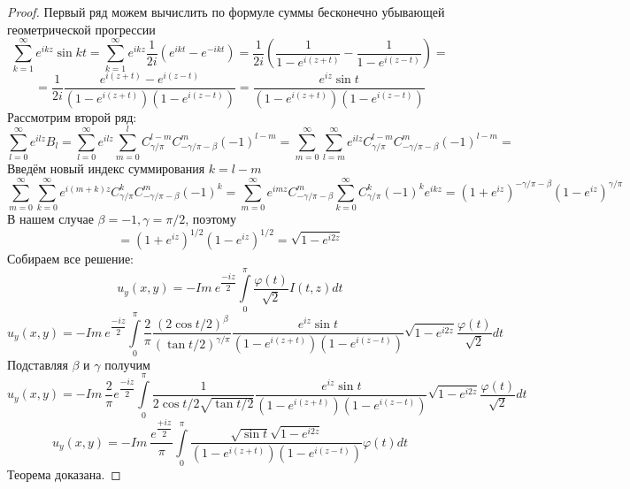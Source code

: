 \documentclass[a4paper, 9pt]{article}
\begin{document}
\begin{proof}
		Первый ряд можем вычислить по формуле суммы бесконечно убывающей геометрической прогрессии
		\begin{equation*}
			\sum\limits_{k=1}^{\infty} e^{ikz}\sin{kt} =  \sum\limits_{k=1}^{\infty} e^{ikz}\dfrac{1}{2i}\left(e^{ikt} - e^{-ikt}\right) = \dfrac1{2i} \left(\dfrac{1}{1 - e^{i(z+t)}} -  \dfrac{1}{1 - e^{i(z-t)}}\right) = 
		\end{equation*}
		\begin{equation*}
			= \dfrac{1}{2i}  \dfrac{e^{i(z+t)} - e^{i(z-t)}}{\left(1 - e^{i(z+t)} \right) \left(1 - e^{i(z-t)}\right)} =  \dfrac{e^{iz} \sin{t}}{\left(1 - e^{i(z+t)} \right) \left(1 - e^{i(z-t)}\right)}
		\end{equation*}
		Рассмотрим второй ряд:
		\begin{equation*}
			\sum\limits_{l =0 }^{\infty} e^{ilz} B_{l} = \sum\limits_{l =0 }^{\infty} e^{ilz} \sum\limits_{m=0}^{l} C^{l - m}_{\gamma/\pi} C^{m}_{-\gamma/\pi - \beta} (-1)^{l-m} = \sum\limits_{m=0}^{\infty} \sum\limits_{l=m}^{\infty} e^{ilz} C^{l - m}_{\gamma/\pi} C^{m}_{-\gamma/\pi - \beta} (-1)^{l-m} = 
		\end{equation*}
		Введём новый индекс суммирования $k = l -m$
		\begin{equation*}
			\sum\limits_{m=0}^{\infty} \sum\limits_{k=0}^{\infty} e^{i(m+k)z} C^{k}_{\gamma/\pi} C^{m}_{-\gamma/\pi - \beta} (-1)^{k} = \sum\limits_{m=0}^{\infty} e^{imz} C^{m}_{-\gamma/\pi - \beta} \sum\limits_{k=0}^{\infty}  C^{k}_{\gamma/\pi} (-1)^k e^{ikz} = (1 + e^{iz})^{-\gamma/\pi - \beta} (1- e^{iz})^{\gamma/\pi} 
		\end{equation*}
		В нашем случае $\beta = -1, \gamma = \pi/2$, поэтому
		\begin{equation*}
			= (1 + e^{iz})^{1/2} (1- e^{iz})^{1/2} =\sqrt{1 - e^{i2z}} 
		\end{equation*}
		Собираем все решение:
		\begin{equation*}
			u_y(x,y) = - Im\ e^{\dfrac{-iz}{2}} \int\limits_0^\pi \dfrac{\varphi(t)}{\sqrt2} I(t,z) dt 
		\end{equation*}
		\begin{equation*}
			u_y(x,y) = - Im\ e^{\dfrac{-iz}{2}} \int\limits_0^\pi \dfrac{2}{\pi}\dfrac{(2\cos{t/2})^\beta}{(\tan{t/2})^{\gamma/\pi}}  \dfrac{e^{iz} \sin{t}}{\left(1 - e^{i(z+t)} \right) \left(1 - e^{i(z-t)}\right)} \sqrt{1 - e^{i2z}} \dfrac{\varphi(t)}{\sqrt2} dt
		\end{equation*}
		Подставляя $\beta$ и $\gamma$ получим
		\begin{equation*}
			u_y(x,y) = - Im\  \dfrac{2}{\pi} e^{\dfrac{-iz}{2}} \int\limits_0^\pi \dfrac{1}{2\cos{t/2} \sqrt{\tan{t/2}}}  \dfrac{e^{iz} \sin{t}}{\left(1 - e^{i(z+t)} \right) \left(1 - e^{i(z-t)}\right)} \sqrt{1 - e^{i2z}} \dfrac{\varphi(t)}{\sqrt2} dt
		\end{equation*}
		\begin{equation*}
			u_y(x,y) = - Im\  \dfrac{e^{\dfrac{+iz}{2}}}{\pi}  \int\limits_0^\pi  \dfrac{\sqrt{\sin{t}} \sqrt{1 - e^{i2z}}}{\left(1 - e^{i(z+t)} \right) \left(1 - e^{i(z-t)}\right)}  \varphi(t) dt
		\end{equation*}
		Теорема доказана.
	\end{proof}
	
\end{document}
